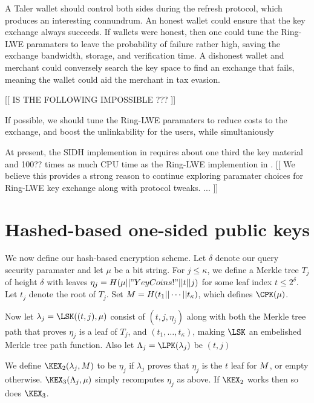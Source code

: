 \documentclass{llncs}
\begin{document}
A Taler wallet should control both sides during the refresh protocol,
 which produces an interesting connundrum.
An honest wallet could ensure that the key exchange always succeeds.
If wallets were honest, then one could tune the Ring-LWE paramaters
to leave the probability of failure rather high,
 saving the exchange bandwidth, storage, and verification time.
A dishonest wallet and merchant could conversely search the key space
to find an exchange that fails, meaning the wallet could aid the
merchant in tax evasion. 

[[ IS THE FOLLOWING IMPOSSIBLE ??? ]]

If possible, we should  tune the Ring-LWE paramaters to reduce costs
to the exchange, and boost the unlinkability for the users, while 
simultaniously


At present, the SIDH implemention in \cite{SIDH16} requires about
one third the key material and 100?? times as much CPU time as the
Ring-LWE implemention in \cite{NewHope}.
[[ We believe this provides a strong reason to continue exploring 
paramater choices for Ring-LWE key exchange along with protocol tweaks.  
... ]]


\section{Hashed-based one-sided public keys}

We now define our hash-based encryption scheme.
Let $\delta$ denote our query security paramater and
 let $\mu$ be a bit string.
For $j \le \kappa$, we define a Merkle tree $T_j$ of height $\delta$
with leaves $\eta_j = H(\mu || "YeyCoins!" || t || j)$
 for some leaf index $t \le 2^\delta$. 
Let $t_j$ denote the root of $T_j$.
Set $M = H(t_1 || \cdots || t_\kappa)$,
 which defines $\CPK(\mu)$.

Now let $\lambda_j = \LSK((t,j),\mu)$ consist of
$(t,j,\eta_j)$ along with both
 the Merkle tree path that proves $\eta_j$ is a leaf of $T_j$,
and $(t_1,\ldots,t_\kappa)$,
 making $\LSK$ an embelished Merkle tree path function.
Also let $\Lambda_j = \LPK(\lambda_j)$ be $(t,j)$

We define $\KEX_2(\lambda_j,\Mu)$ to be $\eta_j$
 if $\lambda_j$ proves that $\eta_j$ is the $t$ leaf for $M$,
or empty otherwise.
$\KEX_3(\Lambda_j,\mu)$ simply recomputes $\eta_j$ as above.
If $\KEX_2$ works then so does $\KEX_3$.
\end{document}
